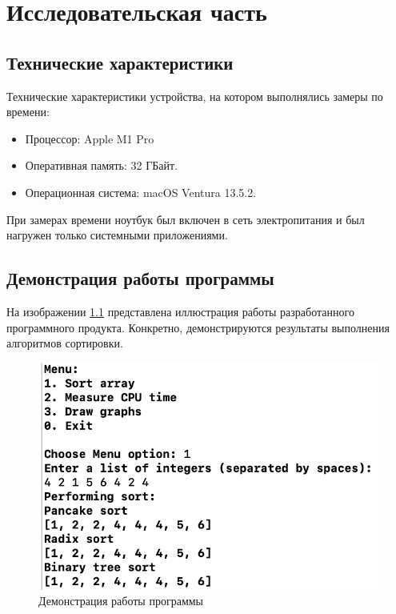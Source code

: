 \chapter{Исследовательская часть}

\section{Технические характеристики}

Технические характеристики устройства, на котором выполнялись замеры по времени:

\begin{itemize}
	\item Процессор: Apple M1 Pro \cite{m1}
	\item Оперативная память: 32 ГБайт.
	\item Операционная система: macOS Ventura 13.5.2. \cite{macOS}
\end{itemize}

При замерах времени ноутбук был включен в сеть электропитания и был нагружен только системными приложениями.

\section{Демонстрация работы программы}

На изображении \ref{img:demonstration} представлена иллюстрация работы разработанного программного продукта. 
Конкретно, демонстрируются результаты выполнения алгоритмов сортировки.
\clearpage
\begin{figure}[h]
	\centering
	\includegraphics[height=0.4\textheight]{img/example.png}
	\caption{Демонстрация работы программы}
	\label{img:demonstration}
\end{figure}


